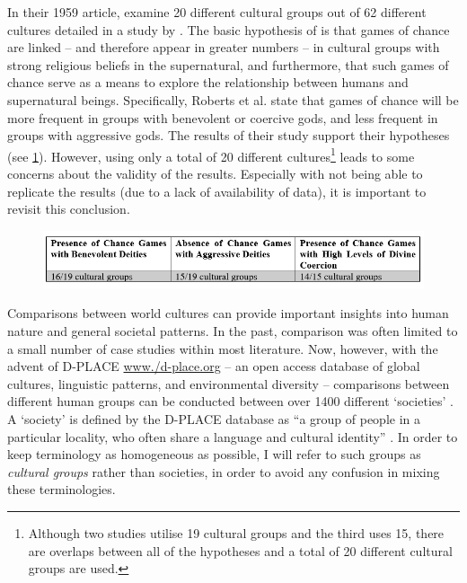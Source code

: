 \documentclass[%
	]{ijsra}
\begin{document}
In their 1959 article, \textcite{roberts1959} examine 20 different cultural groups out of 62 different cultures detailed in a study by \textcite{lambert1959}. The basic hypothesis of \textcite[601--602]{roberts1959} is that games of chance are linked – and therefore appear in greater numbers – in cultural groups with strong religious beliefs in the supernatural, and furthermore, that such games of chance serve as a means to explore the relationship between humans and supernatural beings. Specifically, Roberts et al. state that games of chance will be more frequent in groups with benevolent or coercive gods, and less frequent in groups with aggressive gods. The results of their study support their hypotheses (see \cref{fig:Davis-Table01}). 
However, using only a total of 20 different cultures\footnote{Although two studies utilise 19 cultural groups and the third uses 15, there are overlaps between all of the hypotheses and a total of 20 different cultural groups are used.} leads to some concerns about the validity of the results. Especially with \textcite{chick1998} not being able to replicate the results (due to a lack of availability of data), it is important to revisit this conclusion.
 
 	\begin{figure}[!htb] %
 		\includegraphics[width=\linewidth]{figures/Davis-Table01}
 		\centering
 		\label{fig:Davis-Table01}
 	\end{figure}
 

 
 Comparisons  between world cultures can provide important insights into human nature and general societal patterns. In the past, comparison was often limited to a small number of case studies within most literature. Now, however, with the advent of D-PLACE \href{http:/www./d-place.org}{www./d-place.org} – an open access database of global cultures, linguistic patterns, and environmental diversity – comparisons between different human groups can be conducted between over 1400 different ‘societies’ \parencite{kirby2016}. A ‘society’ is defined by the D-PLACE database as ``a group of people in a particular locality, who often share a language and cultural identity” \parencite{D-PLACE}. In order to keep terminology as homogeneous as possible, I will refer to such groups as \textit{cultural groups} rather than societies, in order to avoid any confusion in mixing these terminologies.
 
\end{document}
